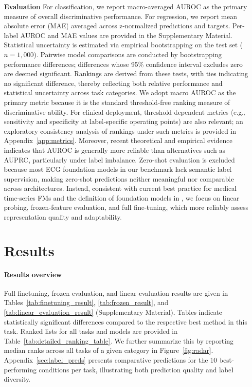 \documentclass{article}
\newcommand{\heading}[1]{\noindent\textbf{#1}}
\begin{document}
        \heading{Evaluation} For classification, we report macro-averaged AUROC as the primary measure of overall discriminative performance. For regression, we report mean absolute error (MAE) averaged across z-normalized predictions and targets. Per-label AUROC and MAE values are provided in the Supplementary Material. Statistical uncertainty is estimated via empirical bootstrapping on the test set ($n=1{,}000$). Pairwise model comparisons are conducted by bootstrapping performance differences; differences whose 95\% confidence interval excludes zero are deemed significant. Rankings are derived from these tests, with ties indicating no significant difference, thereby reflecting both relative performance and statistical uncertainty across task categories. We adopt macro AUROC as the primary metric because it is the standard threshold-free ranking measure of discriminative ability. For clinical deployment, threshold-dependent metrics (e.g., sensitivity and specificity at label-specific operating points) are also relevant; an exploratory consistency analysis of rankings under such metrics is provided in Appendix~\ref{app:metrics}. Moreover, recent theoretical and empirical evidence \citep{mcdermott2024closer} indicates that AUROC is generally more reliable than alternatives such as AUPRC, particularly under label imbalance. Zero-shot evaluation is excluded because most ECG foundation models in our benchmark lack semantic label supervision, making zero-shot predictions neither meaningful nor comparable across architectures. Instead, consistent with current best practice for medical time-series FMs and the definition of foundation models in \citet{bommasani2021opportunities}, we focus on linear probing, frozen-feature evaluation, and full fine-tuning, which more reliably assess representation quality and adaptability.



    \section{Results}
    
    \paragraph{Results overview} Full finetuning, frozen evaluation, and linear evaluation results are given in Tables~\ref{tab:finetuning_result}, \ref{tab:frozen_result}, and \ref{tab:linear_evaluation_result} (Supplementary Material). Tables indicate statistically significant differences compared to the respective best method in this task. Ranked lists for all tasks and models are provided in Table~\ref{tab:detailed_ranking_table}. We further summarize this by reporting median ranks across all tasks of a given category in Figure~\ref{fig:radar}. Appendix~\ref{sec:label_preds} presents comparative predictions for the 10 best-performing conditions per task, illustrating both prediction quality and label diversity.
\end{document}
